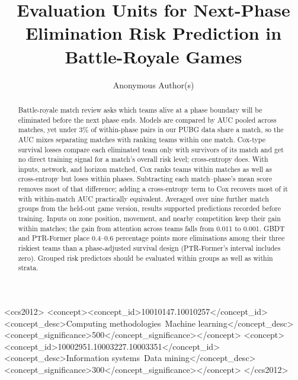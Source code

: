 \documentclass[sigconf,anonymous]{acmart}
\begin{document}
\title{Evaluation Units for Next-Phase Elimination Risk Prediction in Battle-Royale Games}
\renewcommand{\shorttitle}{Evaluation Units for Next-Phase Elimination Prediction}

\author{Anonymous Author(s)}

\begin{abstract}
Battle-royale match review asks which teams alive at a phase boundary will be eliminated before the next phase ends. Models are compared by AUC pooled across matches, yet under 3\% of within-phase pairs in our PUBG data share a match, so the AUC mixes separating matches with ranking teams within one match. Cox-type survival losses compare each eliminated team only with survivors of its match and get no direct training signal for a match's overall risk level; cross-entropy does. With inputs, network, and horizon matched, Cox ranks teams within matches as well as cross-entropy but loses within phases. Subtracting each match--phase's mean score removes most of that difference; adding a cross-entropy term to Cox recovers most of it with within-match AUC practically equivalent. Averaged over nine further match groups from the held-out game version, results supported predictions recorded before training. Inputs on zone position, movement, and nearby competition keep their gain within matches; the gain from attention across teams falls from 0.011 to 0.001. GBDT and PTR-Former place 0.4--0.6 percentage points more eliminations among their three riskiest teams than a phase-adjusted survival design (PTR-Former's interval includes zero). Grouped risk predictors should be evaluated within groups as well as within strata.
\end{abstract}
\begin{CCSXML}
<ccs2012>
<concept><concept_id>10010147.10010257</concept_id><concept_desc>Computing methodologies~Machine learning</concept_desc><concept_significance>500</concept_significance></concept>
<concept><concept_id>10002951.10003227.10003351</concept_id><concept_desc>Information systems~Data mining</concept_desc><concept_significance>300</concept_significance></concept>
</ccs2012>
\end{CCSXML}
\maketitle
\end{document}
